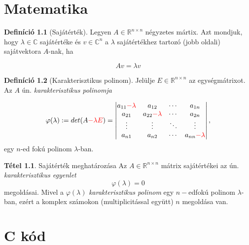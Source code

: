 \documentclass[11pt]{book}
\theoremstyle{definition}
\newtheorem{tet}{Tétel}
\newtheorem{defin}{Definíció}
\begin{document}
\hulipsum[1-6]

\chapter{Matematika}

\begin{defin}[Sajátérték]
Legyen $A \in \mathbb{R}^{n \times n}$ négyzetes mártix. Azt mondjuk, hogy $\lambda \in \mathbb{C}$ sajátértéke és $v \in \mathbb{C}^n$ a $\lambda$ sajátértékhez tartozó (jobb oldali) sajátvektora $A$-nak, ha

\begin{equation}
Av = \lambda v
\end{equation}
\end{defin}

\begin{defin}[Karakterisztikus polinom]
Jelülje $E \in \mathbb{R}^{n \times n}$ az egységmátrixot.
Az $A$ ún. \textit{karakterisztikus polinomja}

\begin{equation}
\varphi(\lambda):=det(A\textcolor{red}{-\lambda E})= \begin{vmatrix}
a_{11} \textcolor{red}{-\lambda} & a_{12} & \cdots & a_{1n} \\
a_{21} & a_{22} \textcolor{red}{-\lambda} & \cdots & a_{2n} \\
\vdots & \vdots & \ddots & \vdots \\
a_{n1} & a_{n2} & \cdots & a_{nn} \textcolor{red}{-\lambda} \\
\end{vmatrix},
\end{equation}
egy $n$-ed fokú polinom $\lambda$-ban.
\end{defin}

\begin{tet}{Sajátérték meghatározása}
Az $A \in \mathbb{R}^{n \times n}$ mátrix sajátértékei az ún. \textit{karakterisztikus egyenlet}
\begin{equation}
\varphi(\lambda) = 0
\end{equation}
megoldásai. Mivel a $\varphi(\lambda)$ \textit{karakterisztikus polinom} egy $n-$edfokú polinom $\lambda$-ban,
ezért a komplex számokon (multiplicitással együtt) $n$ megoldása van.
\end{tet}

\chapter{C kód}
\end{document}
